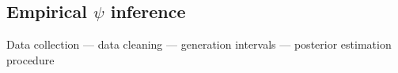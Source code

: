 \subsection{Empirical $\psi$ inference}
\label{sec:methods_empirical-psi-inference}

Data collection --- data cleaning --- generation intervals --- posterior estimation procedure 

\clearpage





